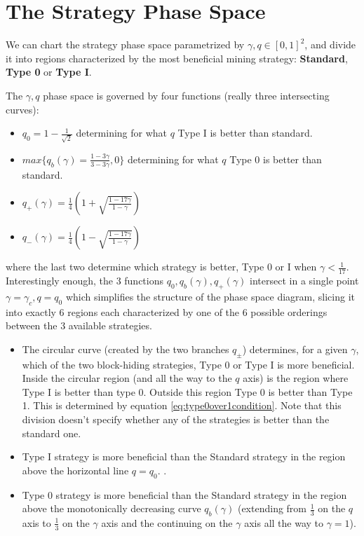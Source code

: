 \documentclass[letterpaper,12pt]{report}
\begin{document}
\section{The Strategy Phase Space}\label{sec:phasespace}

We can chart the strategy phase space parametrized by $\gamma,q\in [0,1]^2$, and divide it into regions characterized by the most beneficial mining strategy: \textbf{Standard}, \textbf{Type 0} or \textbf{Type I}.

The $\gamma, q$ phase space is governed by four functions (really three intersecting curves):
\begin{itemize}
\item $q_0= 1-\frac{1}{\sqrt{2}}$ determining for what $q$ Type I is better than standard.
\item $max\lbrace q_b(\gamma)=\frac{1-3\gamma}{3-3\gamma},0\rbrace$ determining for what $q$ Type 0 is better than standard.
\item $q_+(\gamma)=\frac{1}{4}\left(1+\sqrt{\frac{1-17\gamma}{1-\gamma}}\right)$ 
\item $q_-(\gamma)=\frac{1}{4}\left(1-\sqrt{\frac{1-17\gamma}{1-\gamma}}\right)$
\end{itemize}
where the last two determine which strategy is better, Type 0 or I when $\gamma<\frac{1}{17}$.
Interestingly enough, the 3 functions $q_0, q_b(\gamma), q_+(\gamma)$ intersect in a single point $\gamma=\gamma_c, q=q_0$ which simplifies the structure of the phase space diagram, slicing it into exactly 6 regions each characterized by one of the 6 possible orderings between the 3 available strategies.

\begin{itemize}
\item The circular curve (created by the two branches $q_{\pm}$) determines, for a given $\gamma$, which of the two block-hiding strategies, Type 0 or Type I is more beneficial. Inside the circular region (and all the way to the $q$ axis) is the region where Type I is better than type 0. Outside this region Type 0 is better than Type 1. This is determined by equation \ref{eq:type0over1condition}. Note that this division doesn't specify whether any of the strategies is better than the standard one.
\item Type I strategy is more beneficial than the Standard strategy in the region above the horizontal line $q=q_0$. .
\item Type 0 strategy is more beneficial than the Standard strategy in the region above the monotonically decreasing curve $q_b(\gamma)$ (extending from $\frac{1}{3}$ on the $q$ axis to $\frac{1}{3}$ on the $\gamma$ axis and the continuing on the $\gamma$ axis all the way to $\gamma=1$).
\end{itemize}
\end{document}
